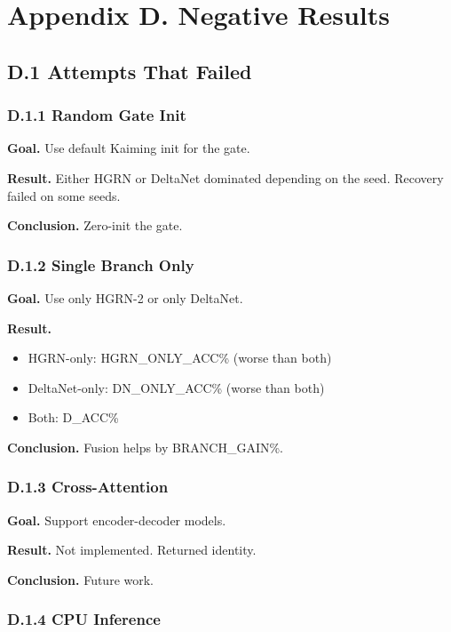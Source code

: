 \section{Appendix D. Negative Results}

\subsection{D.1 Attempts That Failed}

\subsubsection{D.1.1 Random Gate Init}

\textbf{Goal.} Use default Kaiming init for the gate.

\textbf{Result.} Either HGRN or DeltaNet dominated depending on the seed. 
Recovery failed on some seeds.

\textbf{Conclusion.} Zero-init the gate.

\subsubsection{D.1.2 Single Branch Only}

\textbf{Goal.} Use only HGRN-2 or only DeltaNet.

\textbf{Result.}
\begin{itemize}
\item HGRN-only: {{HGRN\_ONLY\_ACC}}\% (worse than both)
\item DeltaNet-only: {{DN\_ONLY\_ACC}}\% (worse than both)
\item Both: {{D\_ACC}}\%

\end{itemize}
\textbf{Conclusion.} Fusion helps by {{BRANCH\_GAIN}}\%.

\subsubsection{D.1.3 Cross-Attention}

\textbf{Goal.} Support encoder-decoder models.

\textbf{Result.} Not implemented. Returned identity.

\textbf{Conclusion.} Future work.

\subsubsection{D.1.4 CPU Inference}

